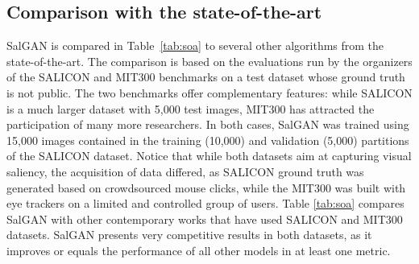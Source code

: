 \documentclass[times,twocolumn,final,authoryear]{elsarticle}
\begin{document}
\subsection{Comparison with the state-of-the-art}
\label{ssec:SoAExp}


SalGAN is compared in Table~\ref{tab:soa} to several other algorithms from the state-of-the-art.
The comparison is based on the evaluations run by the organizers of the SALICON and MIT300 benchmarks on a test dataset whose ground truth is not public.
The two benchmarks offer complementary features: while SALICON is a much larger dataset with 5,000 test images, MIT300 has attracted the participation of many more researchers.
In both cases, SalGAN was trained using 15,000 images contained in the training (10,000) and validation (5,000) partitions of the SALICON dataset.
Notice that while both datasets aim at capturing visual saliency, the acquisition of data differed, as SALICON ground truth was generated based on crowdsourced mouse clicks, while the MIT300 was built with eye trackers on a limited and controlled group of users.
Table \ref{tab:soa} compares SalGAN with other contemporary works that have used SALICON and MIT300 datasets.
SalGAN presents very competitive results in both datasets, as it improves or equals the performance of all other models in at least one metric. 




\end{document}
